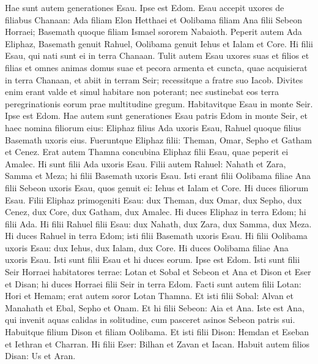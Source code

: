 \begin{biblechapter}  
\verse Hae sunt autem generationes Esau. Ipse est Edom. 
\verse Esau accepit uxores de filiabus Chanaan: Ada filiam Elon Hetthaei et Oolibama filiam Ana filii Sebeon Horraei; 
\verse Basemath quoque filiam Ismael sororem Nabaioth. 
\verse Peperit autem Ada Eliphaz, Basemath genuit Rahuel, 
\verse Oolibama genuit Iehus et Ialam et Core. Hi filii Esau, qui nati sunt ei in terra Chanaan. 
\verse Tulit autem Esau uxores suas et filios et filias et omnes animas domus suae et pecora armenta et cuncta, quae acquisierat in terra Chanaan, et abiit in terram Seir; recessitque a fratre suo Iacob. 
\verse Divites enim erant valde et simul habitare non poterant; nec sustinebat eos terra peregrinationis eorum prae multitudine gregum. 
\verse Habitavitque Esau in monte Seir. Ipse est Edom. 
\verse Hae autem sunt generationes Esau patris Edom in monte Seir, 
\verse et haec nomina filiorum eius: Eliphaz filius Ada uxoris Esau, Rahuel quoque filius Basemath uxoris eius. 
\verse Fueruntque Eliphaz filii: Theman, Omar, Sepho et Gatham et Cenez. 
\verse Erat autem Thamna concubina Eliphaz filii Esau, quae peperit ei Amalec. Hi sunt filii Ada uxoris Esau. 
\verse Filii autem Rahuel: Nahath et Zara, Samma et Meza; hi filii Basemath uxoris Esau. 
\verse Isti erant filii Oolibama filiae Ana filii Sebeon uxoris Esau, quos genuit ei: Iehus et Ialam et Core. 
\verse Hi duces filiorum Esau. Filii Eliphaz primogeniti Esau: dux Theman, dux Omar, dux Sepho, dux Cenez, 
\verse dux Core, dux Gatham, dux Amalec. Hi duces Eliphaz in terra Edom; hi filii Ada. 
\verse Hi filii Rahuel filii Esau: dux Nahath, dux Zara, dux Samma, dux Meza. Hi duces Rahuel in terra Edom; isti filii Basemath uxoris Esau. 
\verse Hi filii Oolibama uxoris Esau: dux Iehus, dux Ialam, dux Core. Hi duces Oolibama filiae Ana uxoris Esau. 
\verse Isti sunt filii Esau et hi duces eorum. Ipse est Edom. 
\verse Isti sunt filii Seir Horraei habitatores terrae: Lotan et Sobal et Sebeon et Ana 
\verse et Dison et Eser et Disan; hi duces Horraei filii Seir in terra Edom.  
\verse Facti sunt autem filii Lotan: Hori et Hemam; erat autem soror Lotan Thamna.  
\verse Et isti filii Sobal: Alvan et Manahath et Ebal, Sepho et Onam. 
\verse Et hi filii Sebeon: Aia et Ana. Iste est Ana, qui invenit aquas calidas in solitudine, cum pasceret asinos Sebeon patris sui. 
\verse Habuitque filium Dison et filiam Oolibama. 
\verse Et isti filii Dison: Hemdan et Eseban et Iethran et Charran. 
\verse Hi filii Eser: Bilhan et Zavan et Iacan. 
\verse Habuit autem filios Disan: Us et Aran. 

\end{biblechapter}
